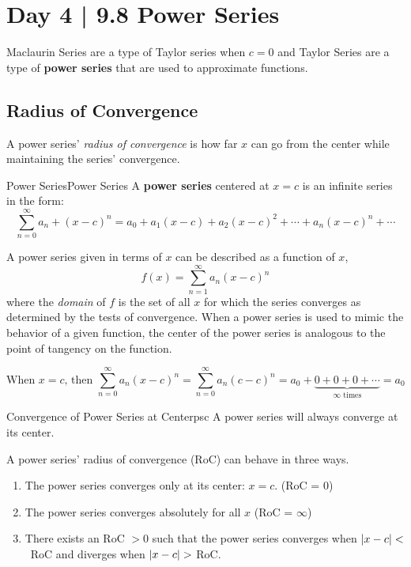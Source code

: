 \documentclass[10pt]{article}
\theoremstyle{definition}
\DeclarePairedDelimiter{\abs}{\lvert}{\rvert}
\begin{document}
\section{Day 4 | 9.8 Power Series}

Maclaurin Series are a type of Taylor series when $c=0$ and Taylor Series are a type of \textbf{power series} that are used to approximate functions.

\subsection{Radius of Convergence}

A power series' \emph{radius of convergence} is how far $x$ can go from the center while maintaining the series' convergence.

\begin{definition}{Power Series}{Power Series}
    A \textbf{power series} centered at $x=c$ is an infinite series in the form:
    \vspace{-0.2cm}
    \[\sum_{n=0}^{\infty} a_n + (x-c)^n = a_0+a_1(x-c)+a_2(x-c)^2+\cdots+a_n(x-c)^n+\cdots\]
\end{definition}

A power series given in terms of $x$ can be described as a function of $x$,\[f(x)=\sum_{n=1}^{\infty} a_n(x-c)^n\] where the \emph{domain} of $f$
is the set of all $x$ for which the series converges as determined by the tests of convergence. When a power series is used to mimic the behavior of a given function, the center of the power series is analogous to the point of tangency on the function.

\[\text{When $x=c$, then } \sum_{n=0}^{\infty} a_n(x-c)^n=\sum_{n=0}^{\infty} a_n(c-c)^n=a_0+\underbrace{0+0+0+\cdots}_{\infty \text{ times}}=a_0\]

\begin{theorem}{Convergence of Power Series at Center}{psc}
    A power series will always converge at its center.
\end{theorem}

\vspace{0.3cm}

A power series' radius of convergence (RoC) can behave in three ways.

\begin{enumerate}
    \item The power series converges only at its center: $x=c$. (RoC = 0)
    \item The power series converges absolutely for all $x$ (RoC = $\infty$)
    \item There exists an RoC $>0$ such that the power series converges when \mbox{$\abs*{x-c}<$ RoC} and diverges when $\abs*{x-c}>$ RoC.
\end{enumerate}
\end{document}
